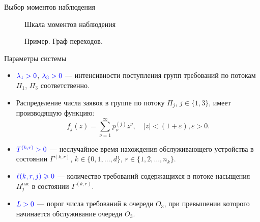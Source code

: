 \documentclass[10pt]{beamer}
\begin{document}
\begin{frame} {Выбор моментов наблюдения}
  \begin{figure}[h]
    \centering
    \caption{Шкала моментов наблюдения}
    \label{VK:fig:3}
  \end{figure}
\end{frame}

   \begin{figure}[h]
    \centering
    \caption{Пример. Граф переходов.}
    \label{VK:fig:4}
  \end{figure}




\begin{frame}{Параметры системы}
\begin{itemize}
    \item 
$\color{blue}\lambda_1>0$, $\color{blue}\lambda_3>0$ --- интенсивности поступления групп требований по потокам  $\Pi_1$, $\Pi_3$ соответственно.
  \item 
{\color{blue}Распределение числа заявок в группе} по потоку $\Pi_j$, $j \in \{1,3\}$, имеет производящую функцию:
\begin{equation}
f_j(z) = \sum_{\nu=1}^{\infty} p_{\nu}^{(j)} z ^{\nu}, \quad |z|<(1+\varepsilon), \varepsilon>0.
    \end{equation}
  \item 
$\color{blue}T^{(k,r)}>0$ --- неслучайное время нахождения обслуживающего устройства в состоянии $\Gamma^{(k,r)}$, $k\in \{0, 1, \ldots, d\}$, $r \in \{1, 2, \ldots, n_k\}$.  
  \item 
$\color{blue}\ell(k,r,j)\geqslant 0$ --- количество требований содержащихся в потоке насыщения $\Pi^{\text{нас}}_j$ в состоянии  $\Gamma^{(k,r)}$.
  \item 
$\color{blue}L > 0$ --- порог числа требований в очереди $O_3$, при превышении которого начинается обслуживание очереди $O_3$.
\end{itemize}

\end{frame}
\end{document}
